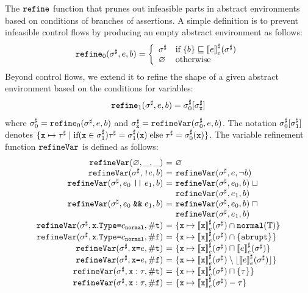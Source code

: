 The $\texttt{refine}$ function that prunes out infeasible parts in abstract environments
based on conditions of branches of assertions.  A simple definition is to
prevent infeasible control flows by producing an empty abstract environment as
follows:
\[
  \texttt{refine}_0({\sigma}^\sharp, e, b) = \left\{
    \begin{array}{ll}
      {\sigma}^\sharp & \text{if} \; \{ b \} \sqsubseteq {\llbracket{e}\rrbracket}^\sharp_e({\sigma}^\sharp)\\
      \varnothing & \text{otherwise}\\
    \end{array}
  \right.
\]
Beyond control flows, we extend it to refine the shape of a given abstract
environment based on the conditions for variables:
\[
  \texttt{refine}_1({\sigma}^\sharp, e, b) = {\sigma}^\sharp_0[{\sigma}^\sharp_{\texttt{x}}]\\
\]
where ${\sigma}^\sharp_0 = \texttt{refine}_0({\sigma}^\sharp, e, b)$ and ${\sigma}^\sharp_{\texttt{x}} =
\texttt{refineVar}({\sigma}^\sharp_0, e, b)$.  The notation ${\sigma}^\sharp_0[{\sigma}^\sharp_1]$ denotes
$\{ \texttt{x} \mapsto \tau^\sharp \mid \text{if} (\texttt{x} \in {\sigma}^\sharp_1) \tau^\sharp = {\sigma}^\sharp_1(\texttt{x}) \;
\text{else} \; \tau^\sharp = {\sigma}^\sharp_0(\texttt{x}) \}$.  The variable refinement function
$\texttt{refineVar}$ is defined as follows:
\[
  \begin{array}{r@{~}c@{~}l}
    \refineVar(\emp, \_, \_) &=&
    \emp\\

    \refineVar(\aenv, \code{!} \expr, \bool) &=&
    \refineVar(\aenv, \expr, \neg \bool)\\

    \refineVar(\aenv, \expr_0 \; \code{||} \; \expr_1, \bool) &=&
    \refineVar(\aenv, \expr_0, \bool) \; \join\\ &&
    \refineVar(\aenv, \expr_1, \bool)\\

    \refineVar(\aenv, \expr_0 \; \code{\&\&} \; \expr_1, \bool) &=&
    \refineVar(\aenv, \expr_0, \bool) \; \meet\\ &&
    \refineVar(\aenv, \expr_1, \bool)\\

    \refineVar(\aenv, \x.\Type \code{=} \nconst{normal}, \true) &=&
    \{ \x \mapsto \aseme{\x}(\aenv) \cap \tnormal(\tyset) \}\\
    \refineVar(\aenv, \x.\Type \code{=} \nconst{normal}, \false) &=&
    \{ \x \mapsto \aseme{\x}(\aenv) \cap \{ \tabrupt \} \}\\

    \refineVar(\aenv, \x \code{=} \expr, \true) &=&
    \{ \x \mapsto \aseme{\x}(\aenv) \meet \aseme{\expr}(\aenv) \}\\
    \refineVar(\aenv, \x \code{=} \expr, \false) &=&
    \{ \x \mapsto \aseme{\x}(\aenv) \setminus \lfloor\aseme{\expr}(\aenv)\rfloor \}\\

    \refineVar(\aenv, \x : \ty, \true) &=&
    \{ \x \mapsto \aseme{\x}(\aenv) \meet \{ \ty \} \}\\
    \refineVar(\aenv, \x : \ty, \false) &=&
    \{ \x \mapsto \aseme{\x}(\aenv) - \ty \}\\
  \end{array}
\]
